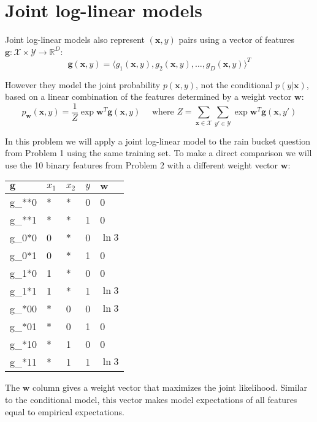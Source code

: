 \documentclass[a4paper,fleqn]{article}
\renewcommand{\vec}{\mathbf}
\begin{document}
\newpage
\section{Joint log-linear models}

Joint log-linear models also represent $(\vec{x}, y)$ pairs using a
vector of features $\vec{g}: \mathcal{X} \times \mathcal{Y}
\rightarrow \mathbb{R}^D$:
\[ \vec{g}(\vec{x}, y) = \langle g_1(\vec{x}, y), g_2(\vec{x}, y), \dots, g_D(\vec{x}, y) \rangle^T \]

However they model the joint probability $p(\vec{x},y)$, not the
conditional $p(y|\vec{x})$, based on a linear combination of the
features determined by a weight vector $\vec{w}$:
\[ p_\vec{w}(\vec{x},y) = \frac{1}{Z}
\exp \vec{w}^T \vec{g}(\vec{x}, y)
\quad\text{ where }
Z = \sum_{\vec{x}\in\mathcal{X}}
\sum_{y'\in\mathcal{Y}} 
\exp \vec{w}^T \vec{g}(\vec{x}, y')
\]

In this problem we will apply a joint log-linear model to the rain
bucket question from Problem 1 using the same training set.  To make a
direct comparison we will use the 10 binary features from Problem 2
with a different weight vector $\vec{w}$:

\begin{center}
\begin{tabular}{lllll}
$\vec{g}$ & $x_1$ & $x_2$ & $y$ & $\vec{w}$ \\ \hline
g_{**0} & * & * & 0 & 0\\
g_{**1} & * & * & 1 & 0\\
g_{0*0} & 0 & * & 0 & $\ln 3$\\
g_{0*1} & 0 & * & 1 & 0\\
g_{1*0} & 1 & * & 0 & 0\\
g_{1*1} & 1 & * & 1 & $\ln 3$\\
g_{*00} & * & 0 & 0 & $\ln 3$\\
g_{*01} & * & 0 & 1 & 0\\
g_{*10} & * & 1 & 0 & 0\\
g_{*11} & * & 1 & 1 & $\ln 3$\\
\end{tabular}
\end{center}

The $\vec{w}$ column gives a weight vector that maximizes the joint
likelihood.  Similar to the conditional model, this vector makes model
expectations of all features equal to empirical expectations.
\end{document}
